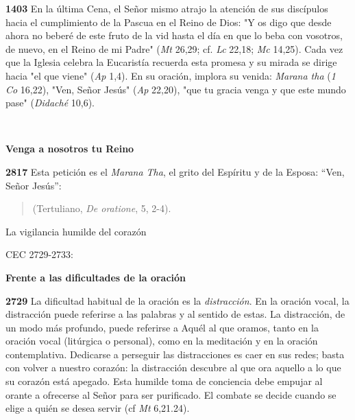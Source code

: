 \documentclass[]{article}
\begin{document}
\textbf{1403} En la última Cena, el Señor mismo atrajo la atención de sus discípulos hacia el cumplimiento de la Pascua en el Reino de Dios: "Y os digo que desde ahora no beberé de este fruto de la vid hasta el día en que lo beba con vosotros, de nuevo, en el Reino de mi Padre" (\emph{Mt} 26,29; cf. \emph{Lc} 22,18; \emph{Mc} 14,25). Cada vez que la Iglesia celebra la Eucaristía recuerda esta promesa y su mirada se dirige hacia "el que viene" (\emph{Ap} 1,4). En su oración, implora su venida: \emph{Marana tha} (\emph{1 Co} 16,22), "Ven, Señor Jesús" (\emph{Ap} 22,20), "que tu gracia venga y que este mundo pase" (\emph{Didaché} 10,6).

\textbf{\\ }

\textbf{Venga a nosotros tu Reino}

\textbf{2817} Esta petición es el \emph{Marana Tha}, el grito del Espíritu y de la Esposa: ``Ven, Señor Jesús'':

\begin{quote} 	 (Tertuliano, \emph{De oratione}, 5, 2-4). \end{quote}

La vigilancia humilde del corazón

CEC 2729-2733:

\textbf{Frente a las dificultades de la oración}

\textbf{2729} La dificultad habitual de la oración es la \emph{distracción}. En la oración vocal, la distracción puede referirse a las palabras y al sentido de estas. La distracción, de un modo más profundo, puede referirse a Aquél al que oramos, tanto en la oración vocal (litúrgica o personal), como en la meditación y en la oración contemplativa. Dedicarse a perseguir las distracciones es caer en sus redes; basta con volver a nuestro corazón: la distracción descubre al que ora aquello a lo que su corazón está apegado. Esta humilde toma de conciencia debe empujar al orante a ofrecerse al Señor para ser purificado. El combate se decide cuando se elige a quién se desea servir (cf \emph{Mt} 6,21.24).
\end{document}

